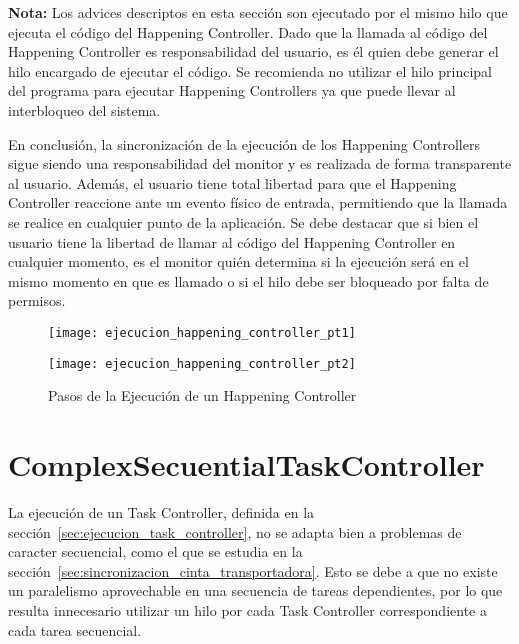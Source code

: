 \begin{framed}
\textbf{Nota:} Los advices descriptos en esta sección son ejecutado por el
mismo hilo que ejecuta el código del Happening Controller. Dado que la llamada
al código del Happening Controller es responsabilidad del usuario, es él quien
debe generar el hilo encargado de ejecutar el código. Se recomienda no utilizar
el hilo principal del programa para ejecutar Happening Controllers ya que puede
llevar al interbloqueo del sistema.
\end{framed}

En conclusión, la sincronización de la ejecución de los Happening Controllers
sigue siendo una responsabilidad del monitor y es realizada de forma
transparente al usuario. Además, el usuario tiene total libertad para que el
Happening Controller reaccione ante un evento físico de entrada, permitiendo
que la llamada se realice en cualquier punto de la aplicación. Se debe destacar
que si bien el usuario tiene la libertad de llamar al código del Happening
Controller en cualquier momento, es el monitor quién determina si la
ejecución será en el mismo momento en que es llamado o si el hilo debe ser
bloqueado por falta de permisos.

\begin{figure}[H]
	\centering
	\texttt{[image: ejecucion\_happening\_controller\_pt1]}
\end{figure}
\begin{figure}[H]
	\centering
	\texttt{[image: ejecucion\_happening\_controller\_pt2]}
	\caption{Pasos de la Ejecución de un Happening Controller}
	\label{fig:ejecucion_happening_controller}
\end{figure}

\section{ComplexSecuentialTaskController}
\label{sec:complex_secuential_task_controller}
La ejecución de un Task Controller, definida en la
sección~\ref{sec:ejecucion_task_controller}, no se adapta bien a
problemas de caracter secuencial, como el que se estudia en la
sección~\ref{sec:sincronizacion_cinta_transportadora}.
Esto se debe a que no existe un paralelismo aprovechable en una secuencia de
tareas dependientes, por lo que resulta innecesario utilizar un hilo
por cada Task Controller correspondiente a cada tarea secuencial.

